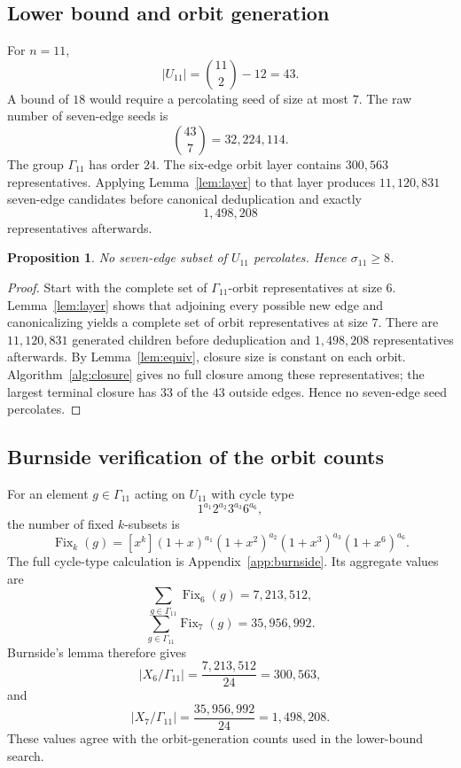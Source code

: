 \documentclass[11pt]{article}
\numberwithin{equation}{section}
\newtheorem{proposition}[theorem]{Proposition}
\begin{document}
\subsection{Lower bound and orbit generation}
For $n=11$,
\[
|U_{11}|=\binom{11}{2}-12=43.
\]
A bound of $18$ would require a percolating seed of size at most $7$. The raw number of seven-edge seeds is
\[
\binom{43}{7}=32,224,114.
\]
The group $\Gamma_{11}$ has order $24$. The six-edge orbit layer contains $300,563$ representatives. Applying Lemma~\ref{lem:layer} to that layer produces $11,120,831$ seven-edge candidates before canonical deduplication and exactly
\[
1,498,208
\]
representatives afterwards.

\begin{proposition}\label{prop:n11lower}
No seven-edge subset of $U_{11}$ percolates. Hence $\sigma_{11}\ge8$.
\end{proposition}

\begin{proof}
Start with the complete set of $\Gamma_{11}$-orbit representatives at size $6$. Lemma~\ref{lem:layer} shows that adjoining every possible new edge and canonicalizing yields a complete set of orbit representatives at size $7$. There are $11,120,831$ generated children before deduplication and $1,498,208$ representatives afterwards. By Lemma~\ref{lem:equiv}, closure size is constant on each orbit. Algorithm~\ref{alg:closure} gives no full closure among these representatives; the largest terminal closure has $33$ of the $43$ outside edges. Hence no seven-edge seed percolates.
\end{proof}

\subsection{Burnside verification of the orbit counts}\label{sec:burnside}
For an element $g\in\Gamma_{11}$ acting on $U_{11}$ with cycle type
\[
1^{a_1}2^{a_2}3^{a_3}6^{a_6},
\]
the number of fixed $k$-subsets is
\[
\operatorname{Fix}_k(g)
=[x^k](1+x)^{a_1}(1+x^2)^{a_2}(1+x^3)^{a_3}(1+x^6)^{a_6}.
\tag{6.3}
\]
The full cycle-type calculation is Appendix~\ref{app:burnside}. Its aggregate values are
\[
\sum_{g\in\Gamma_{11}}\operatorname{Fix}_6(g)=7,213,512,
\]
\[
\sum_{g\in\Gamma_{11}}\operatorname{Fix}_7(g)=35,956,992.
\]
Burnside's lemma therefore gives
\[
|X_6/\Gamma_{11}|=\frac{7,213,512}{24}=300,563,
\tag{6.4}
\]
and
\[
|X_7/\Gamma_{11}|=\frac{35,956,992}{24}=1,498,208.
\tag{6.5}
\]
These values agree with the orbit-generation counts used in the lower-bound search.
\end{document}
